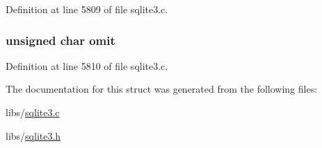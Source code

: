 Definition at line 5809 of file sqlite3.\+c.

\hypertarget{structsqlite3__index__info_1_1sqlite3__index__constraint__usage_ad5b08c06721b109a4a619a7ce0a1a3e2}{}
\subsubsection[{omit}]{\setlength{\rightskip}{0pt plus 5cm}unsigned char omit}\label{structsqlite3__index__info_1_1sqlite3__index__constraint__usage_ad5b08c06721b109a4a619a7ce0a1a3e2}


Definition at line 5810 of file sqlite3.\+c.



The documentation for this struct was generated from the following files\+:\begin{DoxyCompactItemize}
\item 
libs/\hyperlink{sqlite3_8c}{sqlite3.\+c}\item 
libs/\hyperlink{sqlite3_8h}{sqlite3.\+h}\end{DoxyCompactItemize}
